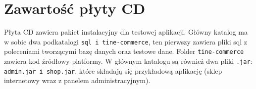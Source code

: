 \chapter{Zawartość płyty CD}
\thispagestyle{chapterBeginStyle}
\label{plytaCD}

Płyta CD zawiera pakiet instalacyjny dla testowej aplikacji. Główny katalog ma w sobie dwa podkatalogi \texttt{sql i tine-commerce}, ten pierwszy zawiera pliki sql z poleceniami tworzącymi bazę danych oraz testowe dane. Folder \texttt{tine-commerce} zawiera kod źródłowy platformy. W głównym katalogu są również dwa pliki \texttt{.jar}: \texttt{admin.jar i shop.jar}, które składają się przykładową aplikację (sklep internetowy wraz z panelem administracyjnym).

